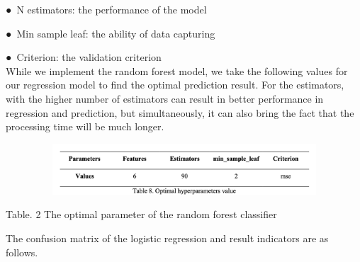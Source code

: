 \documentclass[12pt]{article}
\begin{document}
\begin{justify}
●\  N estimators: the performance of the model
\end{justify}\par

\begin{justify}
●\  Min sample leaf: the ability of data capturing
\end{justify}\par

\begin{justify}
●\  Criterion: the validation criterion\\
While we implement the random forest model, we take the following values for our regression model to find the optimal prediction result. For the estimators, with the higher number of estimators can result in better performance in regression and prediction, but simultaneously, it can also bring the fact that the processing time will be much longer.
\end{justify}\par




\begin{figure}[H]
	\begin{Center}
		\includegraphics[width=4.45in,height=0.75in]{./media/image9.png}
	\end{Center}
\end{figure}



\par

\begin{Center}
{\fontsize{8pt}{9.6pt}\selectfont Table. 2 The optimal parameter of the random forest classifier\par}
\end{Center}\par

The confusion matrix of the logistic regression and result indicators are as follows.\par



\end{document}
